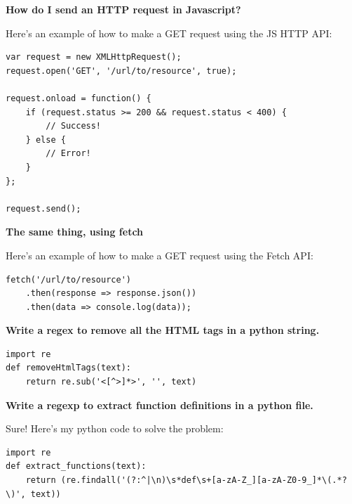 \documentclass[11pt]{article}
\begin{document}
\begin{framed}
\centering
\vspace{.5em}
\begin{minipage}{.9\textwidth}
\textbf{How do I send an HTTP request in Javascript?}

\vspace{1em}

Here’s an example of how to make a GET request using the JS HTTP API:
\begin{lstlisting}
var request = new XMLHttpRequest();
request.open('GET', '/url/to/resource', true);

request.onload = function() {
    if (request.status >= 200 && request.status < 400) {
        // Success!
    } else {
        // Error!
    }
};

request.send();
\end{lstlisting}
\vspace{1em}
\textbf{The same thing, using fetch}
\vspace{1em}

Here’s an example of how to make a GET request using the Fetch API:
\begin{lstlisting}
fetch('/url/to/resource')
    .then(response => response.json())
    .then(data => console.log(data));
\end{lstlisting}

\end{minipage}
\vspace{.5em}
\end{framed}

\begin{framed}
\centering
\vspace{.5em}
\begin{minipage}{.9\textwidth}
\textbf{Write a regex to remove all the HTML tags in a python string. }

\begin{lstlisting}
import re
def removeHtmlTags(text):
    return re.sub('<[^>]*>', '', text)
\end{lstlisting}

\textbf{Write a regexp to extract function definitions in a python file.}

Sure! Here's my python code to solve the problem:
\begin{lstlisting}
import re
def extract_functions(text):
    return (re.findall('(?:^|\n)\s*def\s+[a-zA-Z_][a-zA-Z0-9_]*\(.*?\)', text))
\end{lstlisting}

\end{minipage}
\vspace{.5em}
\end{framed}
\end{document}
